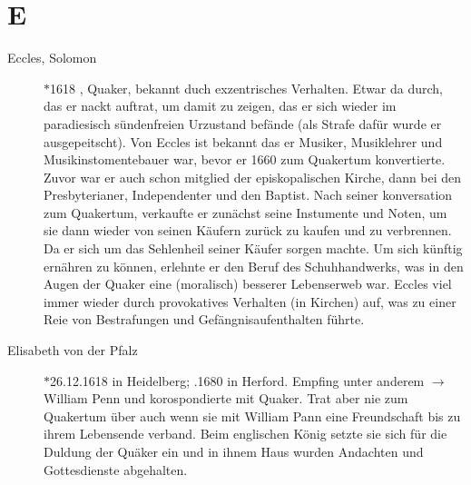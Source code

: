 \section*{E}

\articlesize

\begin{description}

 \item[Eccles, Solomon] $\ast$1618 , Quaker,  bekannt duch exzentrisches
 Verhalten. Etwar da durch, das er nackt auftrat, um damit zu zeigen, das er
 sich wieder im paradiesisch sündenfreien Urzustand befände (als Strafe dafür
 wurde er ausgepeitscht). Von Eccles ist bekannt das er Musiker, Musiklehrer und
 Musikinstomentebauer war, bevor er 1660 zum Quakertum konvertierte. Zuvor
 war er auch schon mitglied der episkopalischen Kirche, dann bei den
 Presbyterianer, Independenter und den Baptist. Nach seiner konversation zum
 Quakertum, verkaufte er zunächst seine Instumente und Noten, um sie dann wieder
 von seinen Käufern zurück zu kaufen und zu verbrennen. Da er sich um das
 Sehlenheil seiner Käufer sorgen machte. Um sich künftig ernähren zu können,
 erlehnte er den Beruf des Schuhhandwerks, was in den Augen der Quaker eine
 (moralisch) besserer Lebenserweb war. Eccles viel immer wieder durch
 provokatives Verhalten (in Kirchen) auf, was zu einer Reie von Bestrafungen und
 Gefängnisaufenthalten führte.


 \item[Elisabeth von der Pfalz] $\ast$26.12.1618 in Heidelberg; .1680
 in Herford. Empfing unter anderem $\to$William Penn und korospondierte mit
 Quaker. Trat aber nie zum Quakertum über auch wenn sie mit William Pann eine
 Freundschaft bis zu ihrem Lebensende verband. Beim englischen König setzte sie
 sich für die Duldung der Quäker ein und in ihnem Haus wurden Andachten und
 Gottesdienste abgehalten.


 \end{description}

\normalsize
